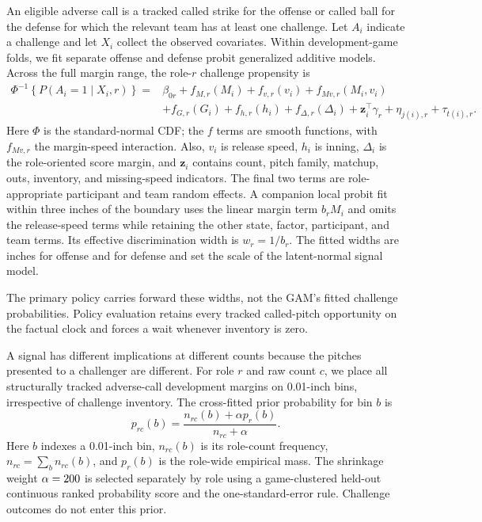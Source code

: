 \documentclass[12pt,letterpaper]{article}
\begin{document}
An eligible adverse call is a tracked called strike for the offense or called
ball for the defense for which the relevant team has at least one challenge.
Let $A_i$ indicate a challenge and let $X_i$ collect the observed covariates.
Within development-game folds, we fit separate offense and defense probit
generalized additive models. Across the full margin range, the role-$r$
challenge propensity is
\begin{equation}
\begin{aligned}
 \Phi^{-1}\!\left\{P(A_i=1\mid X_i,r)\right\}
 ={}&\beta_{0r}+f_{M,r}(M_i)+f_{v,r}(v_i)
      +f_{Mv,r}(M_i,v_i)\\
 &+f_{G,r}(G_i)+f_{h,r}(h_i)+f_{\Delta,r}(\Delta_i)
      +\mathbf z_i^\top\gamma_r+\eta_{j(i),r}+\tau_{t(i),r}.
\end{aligned}
\label{eq:propensity-gam}
\end{equation}
Here $\Phi$ is the standard-normal CDF; the $f$ terms are smooth functions, with
$f_{Mv,r}$ the margin-speed interaction. Also, $v_i$ is release speed, $h_i$ is
inning, $\Delta_i$ is the role-oriented score margin, and $\mathbf z_i$ contains
count, pitch family, matchup, outs, inventory, and missing-speed indicators.
The final two terms are role-appropriate participant and team random effects.
A companion local probit fit within three inches of the boundary uses the
linear margin term $b_rM_i$ and omits the release-speed terms while retaining
the other state, factor, participant, and team terms. Its effective
discrimination width is $w_r=1/b_r$. The fitted widths are
\OffenseEffectiveWidth{} inches for offense and \DefenseEffectiveWidth{} for
defense and set the scale of the latent-normal signal model.

The primary policy carries forward these widths, not the GAM's fitted challenge
probabilities. Policy evaluation retains every tracked called-pitch opportunity
on the factual clock and forces a wait whenever inventory is zero.

A signal has different implications at different counts because the pitches
presented to a challenger are different. For role $r$ and raw count $c$, we
place all structurally tracked adverse-call development margins on 0.01-inch
bins, irrespective of challenge inventory. The cross-fitted prior probability
for bin $b$ is
\begin{equation}
  p_{rc}(b)=\frac{n_{rc}(b)+\alpha p_r(b)}{n_{rc}+\alpha}.
  \label{eq:prior}
\end{equation}
Here $b$ indexes a 0.01-inch bin, $n_{rc}(b)$ is its role-count frequency,
$n_{rc}=\sum_b n_{rc}(b)$, and $p_r(b)$ is the role-wide empirical mass.
The shrinkage weight $\alpha=200{}$ is selected separately by role using a
game-clustered held-out continuous ranked probability score and the
one-standard-error rule. Challenge outcomes do not enter this prior.
\end{document}
